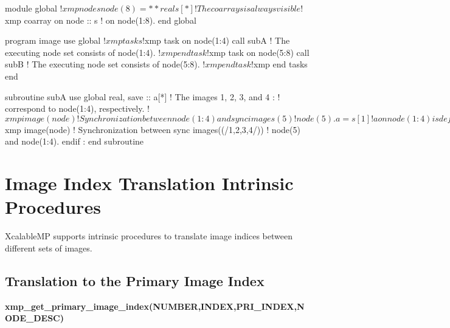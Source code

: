 \begin{XFexample}
      module global
!$xmp nodes node(8)=**
      real s[*]             ! The coarray s is always visible 
!$xmp coarray on node :: s  ! on node(1:8).
      end global

      program image
      use global
!$xmp tasks
!$xmp task on node(1:4) 
        call subA  ! The executing node set consists of node(1:4).
!$xmp end task
!$xmp task on node(5:8) 
        call subB  ! The executing node set consists of node(5:8).
!$xmp end task
!$xmp end tasks
      end

      subroutine subA      
      use global
      real, save :: a[*] ! The images 1, 2, 3, and 4 
         :               ! correspond to node(1:4), respectively.
!$xmp image(node)        ! Synchronization between node(1:4) and
        sync images(5)   ! node(5).
      a = s[1]           ! a on node(1:4) is defined with 
         :               ! the value of s on node(1).
      end subroutine	

      subroutine subB 
      use global
      real, save :: b[*] ! The images 1, 2, 3, and 4 
         :               ! correspond to node(5:8), respectively.
      if(this_image() .eq. 1)then ! The image 1 indicates node(5).
        s[1] = b      ! s on node(1) is defined with the value of 
                      ! b on node(5).
!$xmp   image(node)                ! Synchronization between 
          sync images((/1,2,3,4/)) ! node(5) and node(1:4).
      endif
         :
      end subroutine		
\end{XFexample}


\section{Image Index Translation Intrinsic Procedures}

XcalableMP supports intrinsic procedures to translate
image indices between different sets of images.

\subsection{Translation to the Primary Image Index}

{\bf xmp\_get\_primary\_image\_index(NUMBER,INDEX,PRI\_INDEX,NODE\_DESC)}

